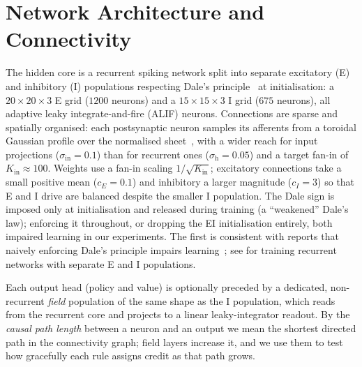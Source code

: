 \documentclass[10pt,twocolumn]{article}
\begin{document}
\clearpage
\onecolumn
\appendix

\section{Network Architecture and Connectivity}
\label{app:arch}
The hidden core is a recurrent spiking network split into separate excitatory
(E) and inhibitory (I) populations respecting Dale's
principle~\citep{dale1935pharmacology,vanVreeswijk1996Chaos} at initialisation:
a $20\times20\times3$ E grid ($1200$ neurons) and a $15\times15\times3$ I grid
($675$ neurons), all adaptive leaky integrate-and-fire (ALIF) neurons.
Connections are sparse and spatially organised: each postsynaptic neuron samples
its afferents from a toroidal Gaussian profile over the normalised
sheet~\citep{Spreizer2019Toroidal}, with a wider reach for input projections
($\sigma_{\mathrm{in}}=0.1$) than for recurrent ones ($\sigma_{\mathrm{h}}=0.05$)
and a target fan-in of $K_{\mathrm{in}}\approx100$. Weights use a fan-in scaling
$1/\sqrt{K_{\mathrm{in}}}$;
excitatory connections take a small positive mean ($c_E=0.1$) and inhibitory a
larger magnitude ($c_I=3$) so that E and I drive are balanced despite the
smaller I population. The Dale sign is imposed only at initialisation and
released during training (a ``weakened'' Dale's law); enforcing it throughout,
or dropping the EI initialisation entirely, both impaired learning in our
experiments. The first is consistent with reports that naively enforcing
Dale's principle impairs learning~\citep{Cornford2021DaleANN}; see
\citet{Song2016DaleEI} for training recurrent networks with separate E and I
populations.

Each output head (policy and value) is optionally preceded by a dedicated,
non-recurrent \emph{field} population of the same shape as the I population,
which reads from the recurrent core and projects to a linear leaky-integrator
readout. By the \emph{causal path length} between a neuron and an output we mean
the shortest directed path in the connectivity graph; field layers increase it,
and we use them to test how gracefully each rule assigns credit as that path
grows.
\end{document}
